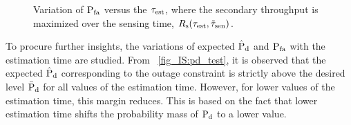 {\begin{figure}
\centering
{}
\caption{Variation of $\text{P}_{\text{fa}}$ versus the $\tau_{\text{est}}$, where the secondary throughput is maximized over the sensing time, $R_{\text{s}}(\tau_{\text{est}},\tilde{\tau}_{\text{sen}})$.}
\label{fig_IS:pf_tsen}%
\end{figure}

To procure further insights, the variations of expected $\hat{\text{P}}_{\text{d}}$ and $\text{P}_{\text{fa}}$ with the estimation time are studied. From \figurename~\ref{fig_IS:pd_test}, it is observed that the expected $\hat{\text{P}}_{\text{d}}$ corresponding to the outage constraint is strictly above the desired level $\bar{\text{P}}_{\text{d}}$ for all values of the estimation time. However, for lower values of the estimation time, this margin reduces. This is based on the fact that lower estimation time shifts the probability mass of $\text{P}_{\text{d}}$ to a lower value. %

}
